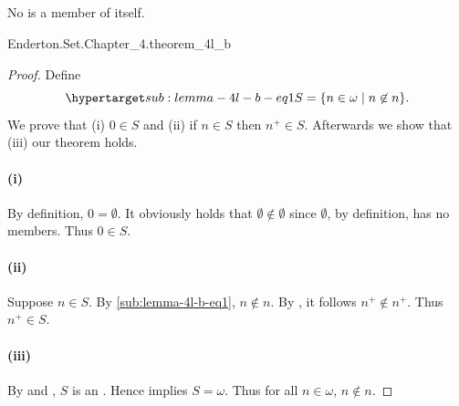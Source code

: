 \documentclass{report}
\begin{document}
\subsection{}%

  \begin{lemma}[4L(b)]
    No  is a member of itself.
  \end{lemma}

    {Enderton.Set.Chapter\_4.theorem\_4l\_b}


  \begin{proof}

    Define
      \begin{equation}
        \hyperlabel{sub:lemma-4l-b-eq1}
        S = \{n \in \omega \mid n \not\in n\}.
      \end{equation}
    We prove that (i) $0 \in S$ and (ii) if $n \in S$ then $n^+ \in S$.
    Afterwards we show that (iii) our theorem holds.

    \paragraph{(i)}%

      By definition, $0 = \emptyset$.
      It obviously holds that $\emptyset \not\in \emptyset$ since $\emptyset$,
        by definition, has no members.
      Thus $0 \in S$.

    \paragraph{(ii)}%

      Suppose $n \in S$.
      By \eqref{sub:lemma-4l-b-eq1}, $n \not\in n$.
      By , it follows $n^+ \not\in n^+$.
      Thus $n^+ \in S$.

    \paragraph{(iii)}%

      By  and , $S$ is an
        .
      Hence  implies $S = \omega$.
      Thus for all $n \in \omega$, $n \not\in n$.

  \end{proof}
\end{document}
